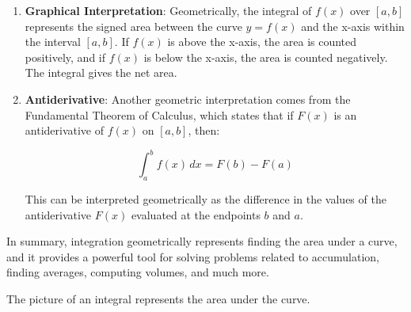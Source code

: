 \begin{enumerate}
    \item \textbf{Graphical Interpretation}: Geometrically, the integral of \( f(x) \) over \([a, b]\) represents the signed area between the curve \( y = f(x) \) and the x-axis within the interval \([a, b]\). If \( f(x) \) is above the x-axis, the area is counted positively, and if \( f(x) \) is below the x-axis, the area is counted negatively. The integral gives the net area.
    
    \item \textbf{Antiderivative}: Another geometric interpretation comes from the Fundamental Theorem of Calculus, which states that if \( F(x) \) is an antiderivative of \( f(x) \) on \([a, b]\), then:
    
    \[ \int_{a}^{b} f(x) \, dx = F(b) - F(a) \]
    
    This can be interpreted geometrically as the difference in the values of the antiderivative \( F(x) \) evaluated at the endpoints \( b \) and \( a \).
\end{enumerate}

In summary, integration geometrically represents finding the area under a curve, and it provides a powerful tool for solving problems related to accumulation, finding averages, computing volumes, and much more.




\begin{center}
    The picture of an integral represents the area under the curve. 
\end{center}